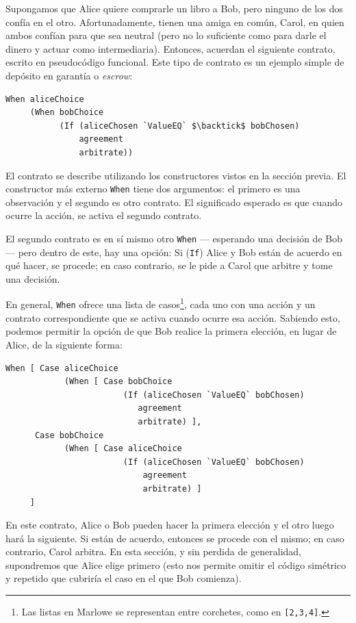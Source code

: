 \documentclass[12pt]{book}
\begin{document}
Supongamos que Alice quiere comprarle un libro a Bob, pero ninguno de los dos confía en el otro. Afortunadamente, tienen una amiga en común, Carol, en quien ambos confían para que sea neutral (pero no lo suficiente como para darle el dinero y actuar como intermediaria). Entonces, acuerdan el siguiente contrato, escrito en pseudocódigo funcional. Este tipo de contrato es un ejemplo simple de depósito en garantía o \textit{escrow}:


\begin{lstlisting}[style=Haskell-cardano, language=Marlowe, caption=Primer pseudocódigo del contrato Escrow.]
When aliceChoice
     (When bobChoice
           (If (aliceChosen `ValueEQ` $\backtick$ bobChosen)
               agreement
               arbitrate))
\end{lstlisting}


El contrato se describe utilizando los constructores vistos en la sección previa. El constructor más externo \texttt{When} tiene dos argumentos: el primero es una observación y el segundo es otro contrato. El significado esperado es que cuando ocurre la acción, se activa el segundo contrato.

El segundo contrato es en sí mismo otro \texttt{When} --- esperando una decisión de Bob --- pero dentro de este, hay una opción: Si (\texttt{If}) Alice y Bob están de acuerdo en qué hacer, se procede; en caso contrario, se le pide a Carol que arbitre y tome una decisión.

En general, \texttt{When} ofrece una lista de casos\footnote{Las listas en Marlowe se representan entre corchetes, como en \texttt{[2,3,4]}.}, cada uno con una acción y un contrato correspondiente que se activa cuando ocurre esa acción. Sabiendo esto, podemos permitir la opción de que Bob realice la primera elección, en lugar de Alice, de la siguiente forma:

\begin{lstlisting}[style=Haskell-cardano, language=Marlowe, caption=Pseudocódigo agnóstico al orden de las elecciones.]
When [ Case aliceChoice
            (When [ Case bobChoice
                        (If (aliceChosen `ValueEQ` bobChosen)
                           agreement
                           arbitrate) ],
      Case bobChoice
            (When [ Case aliceChoice
                        (If (aliceChosen `ValueEQ` bobChosen)
                            agreement
                            arbitrate) ]
     ]
\end{lstlisting}

En este contrato, Alice o Bob pueden hacer la primera elección y el otro luego hará la siguiente. Si están de acuerdo, entonces se procede con el mismo; en caso contrario, Carol arbitra. En esta sección, y sin perdida de generalidad, supondremos que Alice elige primero (esto nos permite omitir el código simétrico y repetido que cubriría el caso en el que Bob comienza).
\end{document}
